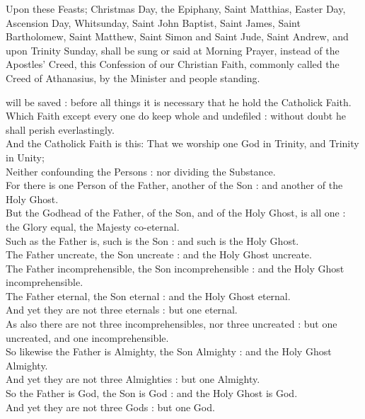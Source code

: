 
\begin{rubric}
Upon these Feasts; Christmas Day, the Epiphany, Saint Matthias, Easter Day, Ascension Day, Whitsunday, Saint John Baptist, Saint James, Saint Bartholomew, Saint Matthew, Saint Simon and Saint Jude, Saint Andrew, and upon Trinity Sunday, shall be sung or said at Morning Prayer, instead of the Apostles' Creed, this Confession of our Christian Faith, commonly called the Creed of Athanasius, by the Minister and people standing.
\end{rubric}

 will be saved : before all things it is necessary that he hold the Catholick Faith.\\
Which Faith except every one do keep whole and undefiled : without doubt he shall perish everlastingly.\\
And the Catholick Faith is this: That we worship one God in Trinity, and Trinity in Unity;\\
Neither confounding the Persons : nor dividing the Substance.\\
For there is one Person of the Father, another of the Son : and another of the Holy Ghost.\\
But the Godhead of the Father, of the Son, and of the Holy Ghost, is all one : the Glory equal, the Majesty co-eternal.\\
Such as the Father is, such is the Son : and such is the Holy Ghost.\\
The Father uncreate, the Son uncreate : and the Holy Ghost uncreate.\\
The Father incomprehensible, the Son incomprehensible : and the Holy Ghost incomprehensible.\\
The Father eternal, the Son eternal : and the Holy Ghost eternal.\\
And yet they are not three eternals : but one eternal.\\
As also there are not three incomprehensibles, nor three uncreated : but one uncreated, and one incomprehensible.\\
So likewise the Father is Almighty, the Son Almighty : and the Holy Ghost Almighty.\\
And yet they are not three Almighties : but one Almighty.\\
So the Father is God, the Son is God : and the Holy Ghost is God.\\
And yet they are not three Gods : but one God.\\
